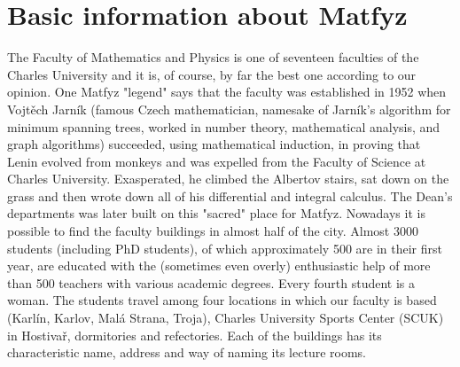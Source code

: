 \section{Basic information about Matfyz}
The Faculty of Mathematics and Physics is one of seventeen faculties of the
Charles University and it is, of course, by far the best one according to our
opinion.
One Matfyz "legend" says that the faculty was established in 1952 when Vojtěch
Jarník (famous Czech mathematician, namesake of Jarník's algorithm for minimum
spanning trees, worked in number theory, mathematical analysis, and graph
algorithms) succeeded, using mathematical induction, in proving that Lenin
evolved from monkeys and was expelled from the Faculty of Science at Charles
University. Exasperated, he climbed the Albertov stairs, sat down on the grass
and then wrote down all of his differential and integral calculus.
The Dean's departments was later built on this "sacred" place for Matfyz.
Nowadays it is possible to find the faculty buildings in almost half of the
city.
Almost 3000 students (including PhD students), of which approximately 500 are in
their first year, are educated with the (sometimes even overly) enthusiastic
help of more than 500 teachers with various academic degrees. Every fourth
student is a woman.
The students travel among four locations in which our faculty is based (Karlín,
Karlov, Malá Strana, Troja), Charles University Sports Center (SCUK) in
Hostivař, dormitories and refectories.
Each of the buildings has its characteristic name, address and way of naming its
lecture rooms.